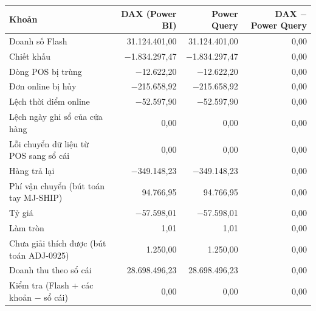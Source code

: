 \begin{tabular}{@{}l r r r@{}}
\toprule
Khoản & DAX (Power BI) & Power Query & DAX $-$ Power Query \\
\midrule
Doanh số Flash & 31.124.401,00 & 31.124.401,00 & 0,00 \\
Chiết khấu & $-$1.834.297,47 & $-$1.834.297,47 & 0,00 \\
Dòng POS bị trùng & $-$12.622,20 & $-$12.622,20 & 0,00 \\
Đơn online bị hủy & $-$215.658,92 & $-$215.658,92 & 0,00 \\
Lệch thời điểm online & $-$52.597,90 & $-$52.597,90 & 0,00 \\
Lệch ngày ghi sổ của cửa hàng & 0,00 & 0,00 & 0,00 \\
Lỗi chuyển dữ liệu từ POS sang sổ cái & 0,00 & 0,00 & 0,00 \\
Hàng trả lại & $-$349.148,23 & $-$349.148,23 & 0,00 \\
Phí vận chuyển (bút toán tay MJ-SHIP) & 94.766,95 & 94.766,95 & 0,00 \\
Tỷ giá & $-$57.598,01 & $-$57.598,01 & 0,00 \\
Làm tròn & 1,01 & 1,01 & 0,00 \\
Chưa giải thích được (bút toán ADJ-0925) & 1.250,00 & 1.250,00 & 0,00 \\
Doanh thu theo sổ cái & 28.698.496,23 & 28.698.496,23 & 0,00 \\
Kiểm tra (Flash + các khoản $-$ sổ cái) & 0,00 & 0,00 & 0,00 \\
\bottomrule
\end{tabular}
